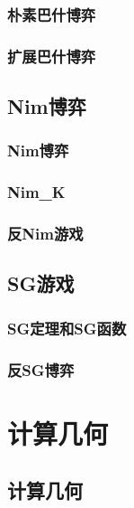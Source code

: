 \documentclass[10pt,a4paper]{article}
\begin{document}
\subsubsection{朴素巴什博弈}
\begin{spacing}{1.5}

\end{spacing}
\subsubsection{扩展巴什博弈}
\begin{spacing}{1.5}

\end{spacing}
\subsection{Nim博弈}
\subsubsection{Nim博弈}
\begin{spacing}{1.5}

\end{spacing}
\subsubsection{Nim\_K}
\begin{spacing}{1.5}

\end{spacing}
\subsubsection{反Nim游戏}
\begin{spacing}{1.5}

\end{spacing}
\subsection{SG游戏}
\subsubsection{SG定理和SG函数}
\begin{spacing}{1.5}

\end{spacing}

\subsubsection{反SG博弈}
\begin{spacing}{1.5}

\end{spacing}
\section{计算几何}
\subsection{计算几何}

\end{document}

